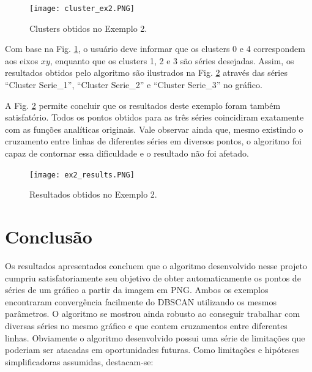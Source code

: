\documentclass{article}
\begin{document}
    \begin{figure}[h]
        \centering
        \texttt{[image: cluster\_ex2.PNG]}
        \caption{Clusters obtidos no Exemplo 2.}
        \label{fig:ex2_2}
    \end{figure}
    
    Com base na Fig. \ref{fig:ex2_2}, o usuário deve informar que os clusters 0 e 4 correspondem aos eixos $xy$, enquanto que os clusters 1, 2 e 3 são séries desejadas. Assim, os resultados obtidos pelo algoritmo são ilustrados na Fig. \ref{fig:ex2_3} através das séries ``Cluster Serie\_1'', ``Cluster Serie\_2'' e ``Cluster Serie\_3'' no gráfico.
    
    A Fig. \ref{fig:ex2_3} permite concluir que os resultados deste exemplo foram também satisfatório. Todos os pontos obtidos para as três séries coincidiram exatamente com as funções analíticas originais. Vale observar ainda que, mesmo existindo o cruzamento entre linhas de diferentes séries em diversos pontos, o algoritmo foi capaz de contornar essa dificuldade e o resultado não foi afetado.
    
    \begin{figure}[h]
        \centering
        \texttt{[image: ex2\_results.PNG]}
        \caption{Resultados obtidos no Exemplo 2.}
        \label{fig:ex2_3}
    \end{figure}
    
    \section{Conclusão}
    
    Os resultados apresentados concluem que o algoritmo desenvolvido nesse projeto cumpriu satisfatoriamente seu objetivo de obter automaticamente os pontos de séries de um gráfico a partir da imagem em PNG. Ambos os exemplos encontraram convergência facilmente do DBSCAN utilizando os mesmos parâmetros. O algoritmo se mostrou ainda robusto ao conseguir trabalhar com diversas séries no mesmo gráfico e que contem cruzamentos entre diferentes linhas. 
    Obviamente o algoritmo desenvolvido possui uma série de limitações que poderiam ser atacadas em oportunidades futuras. Como limitações e hipóteses simplificadoras assumidas, destacam-se:
    
\end{document}
